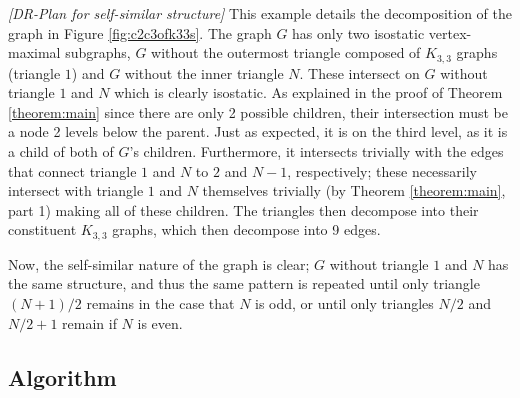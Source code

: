 \myexample
\textsl{[DR-Plan for self-similar structure]}
This example details the decomposition of the graph in Figure \ref{fig:c2c3ofk33s}. The graph $G$ has only two isostatic vertex-maximal subgraphs, $G$ without the outermost triangle composed of $K_{3,3}$ graphs (triangle $1$) and $G$ without the inner triangle $N$. These intersect on $G$ without triangle $1$ and $N$ which is clearly isostatic. As explained in the proof of Theorem \ref{theorem:main} since there are only 2 possible children, their intersection must be a node 2 levels below the parent. Just as expected, it is on the third level, as it is a child of both of $G$'s children. Furthermore, it intersects trivially with the edges that connect triangle $1$ and $N$ to $2$ and $N-1$, respectively; these necessarily intersect with triangle $1$ and $N$ themselves trivially (by Theorem \ref{theorem:main}, part 1) making all of these children. The triangles then decompose into their constituent $K_{3,3}$ graphs, which then decompose into 9 edges.

Now, the self-similar nature of the graph is clear; $G$ without triangle $1$ and $N$ has the same structure, and thus the same pattern is repeated until only triangle $(N+1)/2$ remains in the case that $N$ is odd, or until only triangles $N/2$ and $N/2+1$ remain if $N$ is even.









\subsection{Algorithm}



